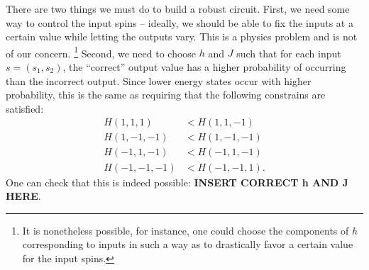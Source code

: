 \documentclass[raggedright, nofonts, notitlepage, openany, debug]{tufte-book}
\begin{document}
There are two things we must do to build a robust circuit. First, we need some way to control the input spins -- ideally, we should be able to fix the inputs at a certain value while letting the outputs vary. This is a physics problem and is not of our concern. \footnote{It is nonetheless possible, for instance, one could choose the components of $h$ corresponding to inputs in such a way as to drastically favor a certain value for the input spins.} Second, we need to choose $h$ and $J$ such that for each input $s = (s_1,s_2)$, the ``correct'' output value has a higher probability of occurring than the incorrect output. Since lower energy states occur with higher probability, this is the same as requiring that the following constrains are satisfied:
\begin{align*}
  H(1,1,1) &< H(1,1,-1) \\
  H(1,-1,-1) &< H(1,-1,-1) \\
  H(-1,1,-1) &< H(-1,1,-1) \\
  H(-1,-1,-1) &< H(-1,-1,1).
\end{align*}
One can check that this is indeed possible: \textbf{INSERT CORRECT h AND J HERE}.
\end{document}
